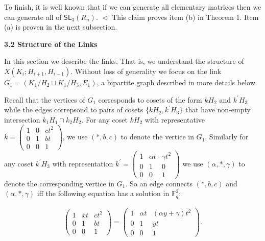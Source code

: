 \documentclass[10pt,a4paper]{article}
\begin{document}
To finish, it is well known that if we can generate all elementary matrices then we can generate all of $\textsf{SL}_{3}(R_{n})$.
$\vartriangleleft$
This claim proves item (b) in Theorem 1. Item (a) is proven in the next subsection.\par






\par\medskip\noindent\textbf{
3.2 Structure of the Links}\par




In this section we describe the links. That is, we understand the structure of $X(K_{i};H_{i+1},H_{i-1})$. Without loss of generality we focus on the link $G_{1}=(K_{1}/H_{2}\sqcup K_{1}/H_{3},E_{1})$, a bipartite graph described in more details below.\par




Recall that the vertices of $G_{1}$ corresponds to cosets of the form $kH_{2}$ and $k^{\prime}H_{3}$ while the edges correpsond to pairs of cosets $\{kH_{2},k^{\prime}H_{3}\}$ that have non-empty intersection $k_{1}H_{1}\cap k_{2}H_{2}$. For any coset $kH_{2}$ with representative $k=\begin{pmatrix}1&0&ct^{2}\\
0&1&bt\\
0&0&1\end{pmatrix}$, we use $(*,b,c)$ to denote the vertice in $G_{1}$. Similarly for any coset $k^{\prime}H_{3}$ with representation $k^{\prime}=\begin{pmatrix}1&\alpha t&\gamma t^{2}\\
0&1&0\\
0&0&1\end{pmatrix}$ we use $(\alpha,*,\gamma)$ to denote the corresponding vertice in $G_{1}$.
So an edge connects $(*,b,c)$ and $(\alpha,*,\gamma)$ iff the following equation has a solution in $\mathbb{F}^{2}_{q}$:\par


\[\begin{gathered}
\displaystyle\begin{pmatrix}1&xt&ct^{2}\\
0&1&bt\\
0&0&1\end{pmatrix}=\begin{pmatrix}1&\alpha t&(\alpha y+\gamma)t^{2}\\
0&1&yt\\
0&0&1\end{pmatrix}.
\end{gathered}\]
\end{document}
